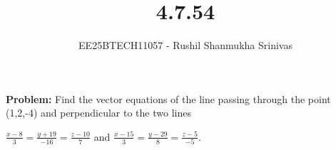 \documentclass[journal]{IEEEtran}
\begin{document}




\title{4.7.54}
\author{EE25BTECH11057 - Rushil Shanmukha Srinivas
}
{\let\newpage\relax\maketitle}

\renewcommand{\thefigure}{\theenumi}
\renewcommand{\thetable}{\theenumi}
\setlength{\intextsep}{10pt} %

\renewcommand{\thetable}{\theenumi}

\textbf{Problem:} Find the vector equations of the line passing through the point (1,2,-4) and 
perpendicular to the two lines 

$\frac{x-8}{3} = \frac{y+19}{-16} = \frac{z-10}{7}$ and
$\frac{x-15}{3} = \frac{y-29}{8} = \frac{z-5}{-5}$.
\end{document}
